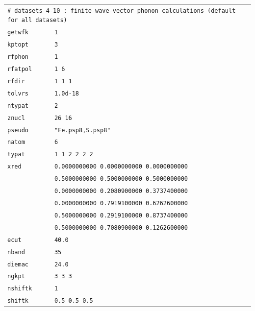 \documentclass[11pt,a4paper]{article}
\begin{document}
\begin{center}
\begin{tabular}{lll}
\multicolumn{3}{l}{\texttt{\# datasets 4-10 : finite-wave-vector phonon calculations (default for all datasets)}}\\
\texttt{getwfk} & \texttt{1} & \\
\texttt{kptopt} & \texttt{3} & \\
\texttt{rfphon} & \texttt{1} & \\
\texttt{rfatpol} & \texttt{1 6} & \\
\texttt{rfdir} & \texttt{1 1 1} & \\
\texttt{tolvrs} & \texttt{1.0d-18} & \\
\texttt{ntypat}&\texttt{2}\\
\texttt{znucl}&\texttt{26 16}\\
\texttt{pseudo}&\texttt{"Fe.psp8,S.psp8"}&\\
\texttt{natom}&\texttt{6}&\\
\texttt{typat}&\texttt{1 1 2 2 2 2}&\\
\texttt{xred} &\texttt{0.0000000000    0.0000000000    0.0000000000}&\\
&\texttt{0.5000000000    0.5000000000    0.5000000000}&\\
&\texttt{0.0000000000    0.2080900000    0.3737400000}&\\
&\texttt{0.0000000000    0.7919100000    0.6262600000}&\\
&\texttt{0.5000000000    0.2919100000    0.8737400000}&\\
&\texttt{0.5000000000    0.7080900000    0.1262600000}&\\
\texttt{ecut} &\texttt{40.0}&\\
\texttt{nband}&\texttt{35}&\\
\texttt{diemac}&\texttt{24.0}&\\
\texttt{ngkpt}&\texttt{3 3 3}&\\\texttt{nshiftk}&\texttt{1}&\\\texttt{shiftk}&\texttt{0.5 0.5 0.5}&\\
\end{tabular}
\end{center}
\newpage
\end{document}
